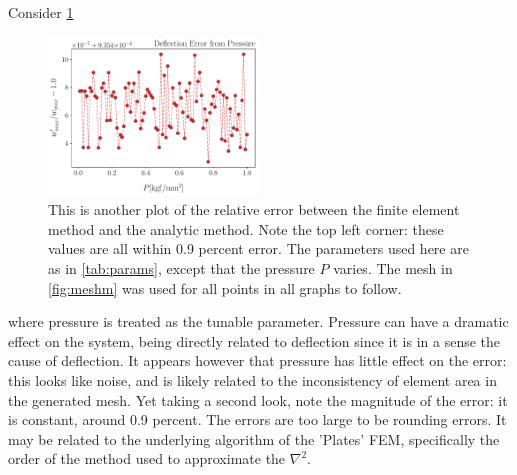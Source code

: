 \documentclass[12pt,times,twocolumn,3p]{elsarticle}
\begin{document}
Consider \cref{fig:vpe}
\begin{figure}[h]
    \centering
    \includegraphics[width=0.5\textwidth]{./yp_scaling_err.pdf}
    \caption{This is another plot of the relative error between the finite
    element method and the analytic method. Note the top left corner: these values
    are all within 0.9 percent error. The parameters used here are as in
    \cref{tab:params}, except that the pressure $P$ varies. The mesh in \cref{fig:meshm}
    was used for all points in all graphs to follow.}
    \label{fig:vpe}
\end{figure}
where pressure is treated as the tunable parameter. Pressure can have a dramatic
effect on the system, being directly related to deflection since it is in a sense
the cause of deflection. It appears however that pressure has little effect on the
error: this looks like noise, and is likely related to the inconsistency of
element area in the generated mesh. Yet taking a second look, note the magnitude
of the error: it is constant, around 0.9 percent. The errors are too large to be
rounding errors. It may be related to the underlying algorithm of the 'Plates'
FEM, specifically the order of the method used to approximate the $\nabla^2$.
\end{document}
